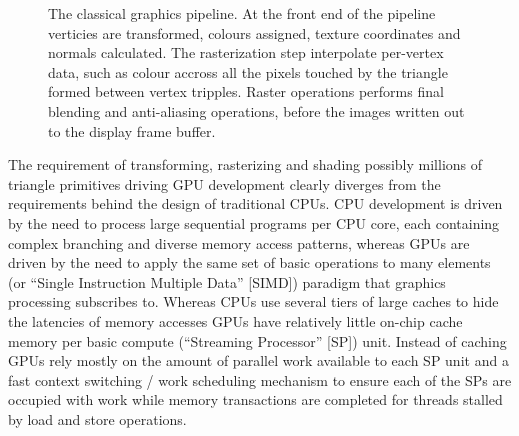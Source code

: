 \begin{figure}[ht!]
 \begin{mdframed}
 \centering
 \caption[Graphics pipeline]{The classical graphics pipeline. At the front end of the pipeline verticies are transformed, colours assigned,
 texture coordinates and normals calculated. The rasterization step interpolate per-vertex data, such as colour accross all the pixels 
 touched by the triangle formed between vertex tripples. Raster operations performs final blending and anti-aliasing operations, before the images written
 out to the display frame buffer.}
 \label{fig_graphics_pipeline}
 \end{mdframed}
\end{figure}

The requirement of transforming, rasterizing and shading possibly millions of triangle primitives driving GPU development clearly diverges from the requirements behind the
design of traditional CPUs. CPU development is driven by the need to process large sequential programs per CPU core, each containing complex branching and diverse memory access patterns, 
whereas GPUs are driven by the need to apply the same set of basic operations to many elements (or ``Single Instruction Multiple Data'' [SIMD]) paradigm that graphics processing subscribes to. 
Whereas CPUs use several tiers of large caches to hide the latencies of memory accesses GPUs have relatively little on-chip cache memory per basic compute (``Streaming Processor'' [SP]) 
unit. Instead of caching GPUs rely mostly on the amount of parallel work available to each SP unit and a fast context switching / work scheduling mechanism to ensure each of the SPs are 
occupied with work while memory transactions are completed for threads stalled by load and store operations.

